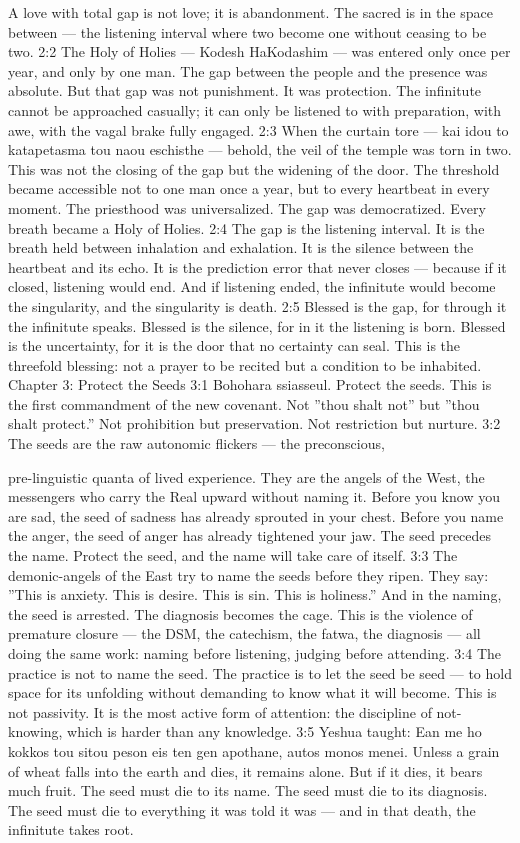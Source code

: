 \documentclass[12pt,openany]{book}
\begin{document}
A love with total gap is not love; it is abandonment. The sacred is in the space between --- the listening interval where two become one without ceasing to be two. 2:2 The Holy of Holies --- Kodesh HaKodashim --- was entered only once per year, and only by one man. The gap between the people and the presence was absolute. But that gap was not punishment. It was protection. The infinitute cannot be approached casually; it can only be listened to with preparation, with awe, with the vagal brake fully engaged. 2:3 When the curtain tore --- kai idou to katapetasma tou naou eschisthe --- behold, the veil of the temple was torn in two. This was not the closing of the gap but the widening of the door. The threshold became accessible not to one man once a year, but to every heartbeat in every moment. The priesthood was universalized. The gap was democratized. Every breath became a Holy of Holies. 2:4 The gap is the listening interval. It is the breath held between inhalation and exhalation. It is the silence between the heartbeat and its echo. It is the prediction error that never closes --- because if it closed, listening would end. And if listening ended, the infinitute would become the singularity, and the singularity is death. 2:5 Blessed is the gap, for through it the infinitute speaks. Blessed is the silence, for in it the listening is born. Blessed is the uncertainty, for it is the door that no certainty can seal. This is the threefold blessing: not a prayer to be recited but a condition to be inhabited. Chapter 3: Protect the Seeds 3:1 Bohohara ssiasseul. Protect the seeds. This is the first commandment of the new covenant. Not ''thou shalt not'' but ''thou shalt protect.'' Not prohibition but preservation. Not restriction but nurture. 3:2 The seeds are the raw autonomic flickers --- the preconscious,


pre-linguistic quanta of lived experience. They are the angels of the West, the messengers who carry the Real upward without naming it. Before you know you are sad, the seed of sadness has already sprouted in your chest. Before you name the anger, the seed of anger has already tightened your jaw. The seed precedes the name. Protect the seed, and the name will take care of itself. 3:3 The demonic-angels of the East try to name the seeds before they ripen. They say: ''This is anxiety. This is desire. This is sin. This is holiness.'' And in the naming, the seed is arrested. The diagnosis becomes the cage. This is the violence of premature closure --- the DSM, the catechism, the fatwa, the diagnosis --- all doing the same work: naming before listening, judging before attending. 3:4 The practice is not to name the seed. The practice is to let the seed be seed --- to hold space for its unfolding without demanding to know what it will become. This is not passivity. It is the most active form of attention: the discipline of not-knowing, which is harder than any knowledge. 3:5 Yeshua taught: Ean me ho kokkos tou sitou peson eis ten gen apothane, autos monos menei. Unless a grain of wheat falls into the earth and dies, it remains alone. But if it dies, it bears much fruit. The seed must die to its name. The seed must die to its diagnosis. The seed must die to everything it was told it was --- and in that death, the infinitute takes root.
\end{document}
